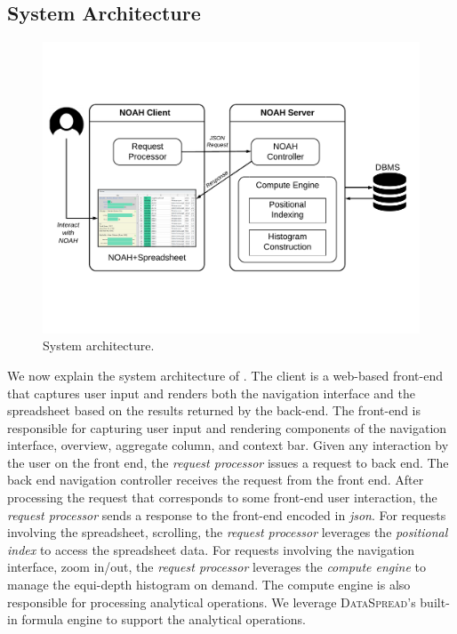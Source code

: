 \subsection{System Architecture}

\begin{figure}
    \centering
    \includegraphics[trim=0 4cm 0 3cm,clip,width=\linewidth]{images/arch.pdf}
   \caption{System architecture.}
   \label{fig:arch}
 \end{figure} 

We now explain the system architecture of \noah. 
The \noah client is a web-based front-end that captures user input and renders both the navigation interface and the spreadsheet 
based on the results returned by the back-end. 
The front-end is responsible for capturing user input and rendering components of the navigation interface, \ie overview, aggregate column, and context bar. 
Given any interaction by the user on the front end, 
the \emph{request processor} issues a request to back end.
The back end navigation controller receives the request from the front end. 
After processing the request that corresponds to some front-end user interaction, 
the \emph{request processor} sends a response to the front-end encoded in \emph{json}. 
For requests involving the spreadsheet, \eg scrolling, 
the \emph{request processor} leverages the \emph{positional index} 
to access the spreadsheet data. 
For requests involving the navigation interface, \eg zoom in/out, 
the \emph{request processor} leverages the \emph{compute engine} to manage the equi-depth histogram on demand. 
The compute engine is also responsible for processing analytical operations. We leverage {\scshape DataSpread}’s built-in formula engine to support the analytical operations.


